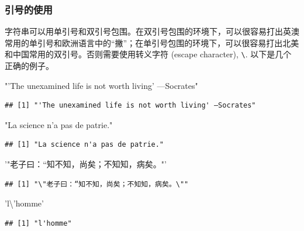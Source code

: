 \documentclass[]{book}
\newenvironment{Shaded}{\begin{snugshade}}{\end{snugshade}}
\newcommand{\CharTok}[1]{\textcolor[rgb]{0.31,0.60,0.02}{#1}}
\newcommand{\StringTok}[1]{\textcolor[rgb]{0.31,0.60,0.02}{#1}}
\begin{document}
\subsubsection{引号的使用}

字符串可以用单引号和双引号包围。在双引号包围的环境下，可以很容易打出英澳常用的单引号和欧洲语言中的``撇''；在单引号包围的环境下，可以很容易打出北美和中国常用的双引号。否则需要使用转义字符 (escape character), \texttt{\textbackslash{}}. 以下是几个正确的例子。

\begin{Shaded}
\begin{Highlighting}[]
\StringTok{"'The unexamined life is not worth living' —Socrates"}
\end{Highlighting}
\end{Shaded}

\begin{verbatim}
## [1] "'The unexamined life is not worth living' —Socrates"
\end{verbatim}

\begin{Shaded}
\begin{Highlighting}[]
\StringTok{"La science n'a pas de patrie."}
\end{Highlighting}
\end{Shaded}

\begin{verbatim}
## [1] "La science n'a pas de patrie."
\end{verbatim}

\begin{Shaded}
\begin{Highlighting}[]
\StringTok{'"老子曰：“知不知，尚矣；不知知，病矣。"'}
\end{Highlighting}
\end{Shaded}

\begin{verbatim}
## [1] "\"老子曰：“知不知，尚矣；不知知，病矣。\""
\end{verbatim}

\begin{Shaded}
\begin{Highlighting}[]
\StringTok{'l}\CharTok{\textbackslash{}'}\StringTok{homme'}
\end{Highlighting}
\end{Shaded}

\begin{verbatim}
## [1] "l'homme"
\end{verbatim}
\end{document}

